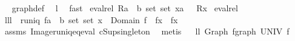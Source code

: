 \begin{isabellebody}
\isadelimproof
\ %
\endisadelimproof
%
\isatagproof
{}\isamarkupfalse%
\ graph{\isacharunderscore}def\ \isamarkupfalse%
\ l{}{}\ \isamarkupfalse%
\ fast%
\endisatagproof
{\isafoldproof}%
%
\isadelimproof
%
\endisadelimproof
\isanewline
\isanewline
{}\isamarkupfalse%
\ {\isachardoublequoteopen}eval{\isacharunderscore}rel{}\ {\isacharparenleft}R{\isacharcolon}{\isacharcolon}{\isacharparenleft}{\isacharprime}a\ {\isasymtimes}\ {\isacharparenleft}{\isacharprime}b\ set{\isacharparenright}{\isacharparenright}\ set{\isacharparenright}\ {\isacharparenleft}x{\isacharcolon}{\isacharcolon}{\isacharprime}a{\isacharparenright}\ {\isacharequal}{\isacharequal}\ {\isasymUnion}\ {\isacharparenleft}R{\isacharbackquote}{\isacharbackquote}{\isacharbraceleft}x{\isacharbraceright}{\isacharparenright}{\isachardoublequoteclose}\isanewline
{}\isamarkupfalse%
\ eval{\isacharunderscore}rel{}\ {\isacharparenleft}\ {\isachardoublequoteopen}{\isacharcomma}{\isacharcomma}{\isacharcomma}{\isachardoublequoteclose}\ {}{}{\isacharparenright}\isanewline
\isanewline
\isanewline
\isanewline
\isanewline
\isanewline
\isanewline
\isanewline
\isanewline
\isanewline
\isanewline
\isanewline
\isanewline
\isanewline
\isanewline
{}\isamarkupfalse%
\ lll{}{}{\isacharcolon}\ \ {\isachardoublequoteopen}runiq\ {\isacharparenleft}f{\isacharcolon}{\isacharcolon}{\isacharparenleft}{\isacharparenleft}{\isacharprime}a\ {\isasymtimes}\ {\isacharparenleft}{\isacharprime}b\ set{\isacharparenright}{\isacharparenright}\ set{\isacharparenright}{\isacharparenright}{\isachardoublequoteclose}\ {\isachardoublequoteopen}x\ {\isasymin}\ Domain\ f{\isachardoublequoteclose}\ \ {\isachardoublequoteopen}f{\isacharcomma}{\isacharcomma}x\ {\isacharequal}\ f{\isacharcomma}{\isacharcomma}{\isacharcomma}x{\isachardoublequoteclose}\isanewline
%
\isadelimproof
%
\endisadelimproof
%
\isatagproof
{}\isamarkupfalse%
\ assms\ Image{\isacharunderscore}runiq{\isacharunderscore}eq{\isacharunderscore}eval\ cSup{\isacharunderscore}singleton\ \isamarkupfalse%
\ metis%
\endisatagproof
{\isafoldproof}%
%
\isadelimproof
\isanewline
%
\endisadelimproof
\ \isanewline
\isanewline
{}\isamarkupfalse%
\ ll{}{}{\isacharcolon}\ {\isachardoublequoteopen}Graph\ f{\isacharequal}graph\ UNIV\ f{\isachardoublequoteclose}%
\isadelimproof

\end{isabellebody}
